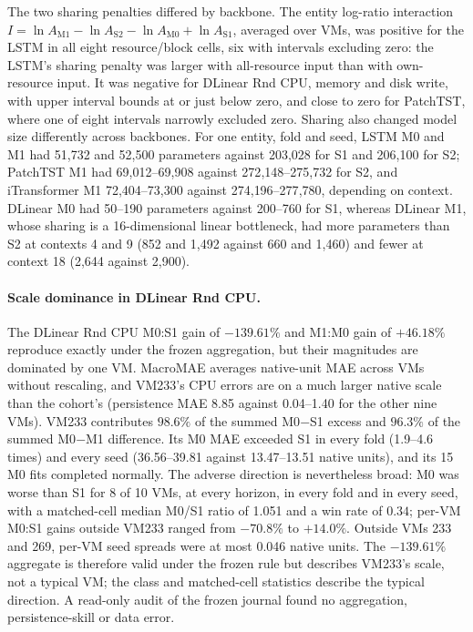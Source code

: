 \documentclass[5p,twocolumn]{elsarticle}
\begin{document}
The two sharing penalties differed by backbone. The entity log-ratio
interaction $I=\ln A_{\mathrm{M1}}-\ln A_{\mathrm{S2}}-\ln A_{\mathrm{M0}}
+\ln A_{\mathrm{S1}}$, averaged over VMs, was positive for the LSTM in all eight
resource/block cells, six with intervals excluding zero: the LSTM's sharing
penalty was larger with all-resource input than with own-resource input. It
was negative for DLinear Rnd CPU, memory and disk write, with upper interval
bounds at or just below zero, and close to zero for PatchTST, where one of
eight intervals narrowly excluded zero. Sharing also changed model size
differently across backbones. For one entity, fold and seed, LSTM M0 and M1
had 51{,}732 and 52{,}500 parameters against 203{,}028 for S1 and 206{,}100
for S2; PatchTST M1 had 69{,}012--69{,}908 against 272{,}148--275{,}732 for
S2, and iTransformer M1 72{,}404--73{,}300 against 274{,}196--277{,}780,
depending on context. DLinear M0 had 50--190 parameters against 200--760 for
S1, whereas DLinear M1, whose sharing is a 16-dimensional linear bottleneck,
had more parameters than S2 at contexts 4 and 9 (852 and 1{,}492 against 660
and 1{,}460) and fewer at context 18 (2{,}644 against 2{,}900).

\paragraph{Scale dominance in DLinear Rnd CPU.}
The DLinear Rnd CPU M0:S1 gain of $-139.61\%$ and M1:M0 gain of $+46.18\%$
reproduce exactly under the frozen aggregation, but their magnitudes are
dominated by one VM. MacroMAE averages native-unit MAE across VMs without
rescaling, and VM233's CPU errors are on a much larger native scale than the
cohort's (persistence MAE 8.85 against 0.04--1.40 for the other nine VMs).
VM233 contributes $98.6\%$ of the summed M0$-$S1 excess and $96.3\%$ of the
summed M0$-$M1 difference. Its M0 MAE exceeded S1 in every fold (1.9--4.6
times) and every seed (36.56--39.81 against 13.47--13.51 native units), and
its 15 M0 fits completed normally. The adverse direction is nevertheless
broad: M0 was worse than S1 for 8 of 10 VMs, at every horizon, in every fold
and in every seed, with a matched-cell median M0/S1 ratio of 1.051 and a win
rate of $0.34$; per-VM M0:S1 gains outside VM233 ranged from $-70.8\%$ to
$+14.0\%$. Outside VMs 233 and 269, per-VM seed spreads were at most 0.046
native units. The $-139.61\%$ aggregate is therefore valid under the frozen
rule but describes VM233's scale, not a typical VM; the class and matched-cell
statistics describe the typical direction. A read-only audit of the frozen
journal found no aggregation, persistence-skill or data error.
\end{document}
